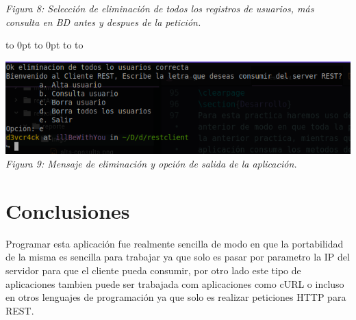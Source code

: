 \documentclass[10pt,executivepaper]{article}
\def\fillandplacepagenumber{%
 \par\pagestyle{empty}%
 \vbox to 0pt{\vss}\vfill
 \vbox to 0pt{\baselineskip0pt
   \hbox to\linewidth{\hss}%
   \baselineskip\footskip
   \hbox to\linewidth{%
     \hfil\thepage\hfil}\vss}}
\begin{document}
\begin{center}
\begin{landscape}
    \textit{Figura 8: Selección de eliminación de todos los registros de usuarios, más consulta en BD antes y despues de la petición.}
    \fillandplacepagenumber
  \end{landscape}
  \includegraphics[scale=0.5]{imgs/msg_all.png}\\
  \textit{Figura 9: Mensaje de eliminación y opción de salida de la aplicación.}
\end{center}

\section{Conclusiones}
Programar esta aplicación fue realmente sencilla de modo en que la portabilidad de la misma es sencilla para trabajar ya que solo es pasar por parametro la IP del servidor para que el cliente pueda consumir, por otro lado este tipo de aplicaciones tambien puede ser trabajada com aplicaciones como cURL o incluso en otros lenguajes de programación ya que solo es realizar peticiones HTTP para REST.
\end{document}
